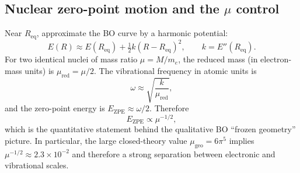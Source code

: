 \subsection{Nuclear zero-point motion and the \texorpdfstring{$\mu$}{mu} control}
Near $R_{\mathrm{eq}}$, approximate the BO curve by a harmonic potential:
\[
E(R)\approx E(R_{\mathrm{eq}})+\tfrac12 k (R-R_{\mathrm{eq}})^2,
\qquad
k=E''(R_{\mathrm{eq}}).
\]
For two identical nuclei of mass ratio $\mu=M/m_e$, the reduced mass (in electron-mass units) is $\mu_{\mathrm{red}}=\mu/2$. The vibrational frequency in atomic units is
\begin{equation}
\omega\approx \sqrt{\frac{k}{\mu_{\mathrm{red}}}},
\end{equation}
and the zero-point energy is $E_{\mathrm{ZPE}}\approx \omega/2$. Therefore
\begin{equation}
E_{\mathrm{ZPE}}\propto \mu^{-1/2},
\end{equation}
which is the quantitative statement behind the qualitative BO ``frozen geometry'' picture. In particular, the large closed-theory value $\mu_{\mathrm{geo}}=6\pi^5$ implies $\mu^{-1/2}\approx 2.3\times 10^{-2}$ and therefore a strong separation between electronic and vibrational scales.


